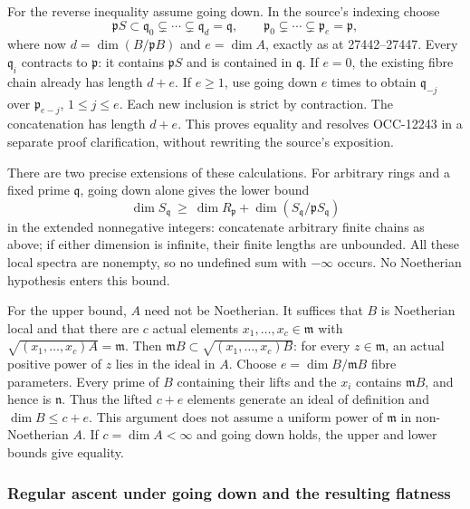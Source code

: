 For the reverse inequality assume going down. In the source's indexing choose \[
 \mathfrak pS\subset\mathfrak q_0\subsetneq\cdots
 \subsetneq\mathfrak q_d=\mathfrak q,\qquad
 \mathfrak p_0\subsetneq\cdots\subsetneq\mathfrak p_e=\mathfrak p,
\] where now \(d=\dim(B/\mathfrak pB)\) and \(e=\dim A\), exactly as at 27442--27447. Every \(\mathfrak q_i\) contracts to \(\mathfrak p\): it contains \(\mathfrak pS\) and is contained in \(\mathfrak q\). If \(e=0\), the existing fibre chain already has length \(d+e\). If \(e\geq1\), use going down \(e\) times to obtain \(\mathfrak q_{-j}\) over \(\mathfrak p_{e-j}\), \(1\leq j\leq e\). Each new inclusion is strict by contraction. The concatenation has length \(d+e\). This proves equality and resolves OCC-12243 in a separate proof clarification, without rewriting the source's exposition.

There are two precise extensions of these calculations. For arbitrary rings and a fixed prime \(\mathfrak q\), going down alone gives the lower bound \[
 \dim S_{\mathfrak q}\ \geq\
 \dim R_{\mathfrak p}+\dim(S_{\mathfrak q}/\mathfrak pS_{\mathfrak q})
\] in the extended nonnegative integers: concatenate arbitrary finite chains as above; if either dimension is infinite, their finite lengths are unbounded. All these local spectra are nonempty, so no undefined sum with \(-\infty\) occurs. No Noetherian hypothesis enters this bound.

For the upper bound, \(A\) need not be Noetherian. It suffices that \(B\) is Noetherian local and that there are \(c\) actual elements \(x_1,\ldots,x_c\in\mathfrak m\) with \(\sqrt{(x_1,\ldots,x_c)A}=\mathfrak m\). Then \(\mathfrak mB\subset\sqrt{(x_1,\ldots,x_c)B}\): for every \(z\in
\mathfrak m\), an actual positive power of \(z\) lies in the ideal in \(A\). Choose \(e=\dim B/\mathfrak mB\) fibre parameters. Every prime of \(B\) containing their lifts and the \(x_i\) contains \(\mathfrak mB\), and hence is \(\mathfrak n\). Thus the lifted \(c+e\) elements generate an ideal of definition and \(\dim B\leq c+e\). This argument does not assume a uniform power of \(\mathfrak m\) in non-Noetherian \(A\). If \(c=\dim A<\infty\) and going down holds, the upper and lower bounds give equality.

\subsubsection{Regular ascent under going down and the resulting flatness}\label{algebra-proof-024-regular-ascent-under-going-down-and-the-resulting-flatness}

